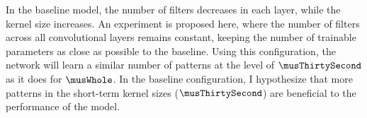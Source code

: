 
In the baseline model, the number of filters decreases in
each layer, while the kernel size increases. An experiment
is proposed here, where the number of filters across all
convolutional layers remains constant, keeping the number of
trainable parameters as close as possible to the baseline.
Using this configuration, the network will learn a similar
number of patterns at the level of $\musThirtySecond$ as it
does for $\musWhole$. In the baseline configuration, I
hypothesize that more patterns in the short-term kernel
sizes ($\musThirtySecond$) are beneficial to the performance of
the model.
